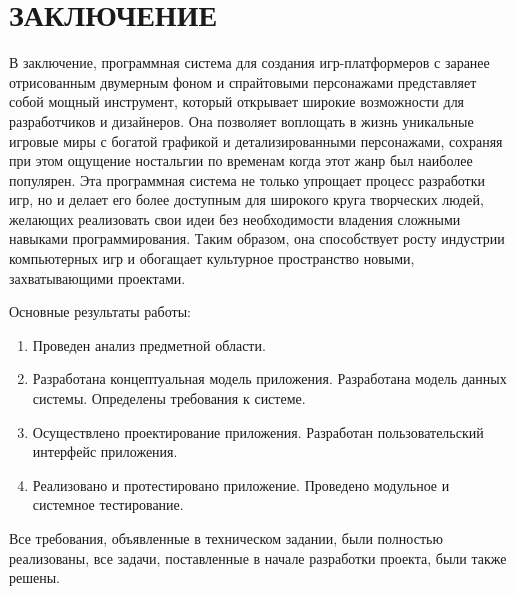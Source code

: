 \section*{ЗАКЛЮЧЕНИЕ}

В заключение, программная система для создания игр-платформеров с заранее отрисованным двумерным фоном и спрайтовыми персонажами представляет собой мощный инструмент, который открывает широкие возможности для разработчиков и дизайнеров. Она позволяет воплощать в жизнь уникальные игровые миры с богатой графикой и детализированными персонажами, сохраняя при этом ощущение ностальгии по временам когда этот жанр был наиболее популярен. Эта программная система не только упрощает процесс разработки игр, но и делает его более доступным для широкого круга творческих людей, желающих реализовать свои идеи без необходимости владения сложными навыками программирования. Таким образом, она способствует росту индустрии компьютерных игр и обогащает культурное пространство новыми, захватывающими проектами.

Основные результаты работы:

\begin{enumerate}
	\item Проведен анализ предметной области.
	\item Разработана концептуальная модель приложения. Разработана модель данных системы. Определены требования к системе.
	\item Осуществлено проектирование приложения. Разработан пользовательский интерфейс приложения.
	\item Реализовано и протестировано приложение. Проведено модульное и системное тестирование.
\end{enumerate}

Все требования, объявленные в техническом задании, были полностью реализованы, все задачи, поставленные в начале разработки проекта, были также решены.